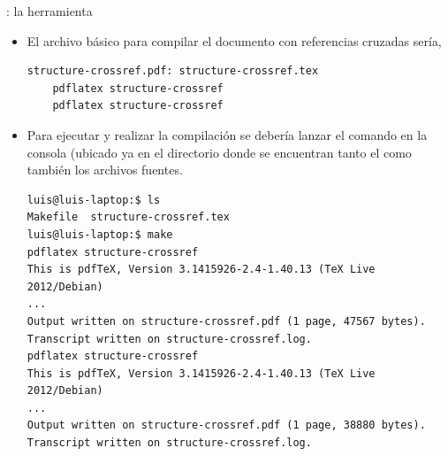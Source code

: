 \documentclass{beamer}
\begin{document}
\begin{frame}[fragile]{\insertsection: la herramienta }
  \begin{itemize}
    \item El archivo  básico para compilar el documento
      con referencias cruzadas sería,
    \begin{center}
      \begin{verbatim}
structure-crossref.pdf: structure-crossref.tex
	pdflatex structure-crossref
	pdflatex structure-crossref
      \end{verbatim}
    \end{center}
  \item Para ejecutar y realizar la compilación se debería lanzar el
    comando  en la consola (ubicado ya en el directorio
    donde se encuentran tanto el  como también los
    archivos fuentes.
    \begin{center}
      \begin{verbatim}
luis@luis-laptop:$ ls
Makefile  structure-crossref.tex
luis@luis-laptop:$ make
pdflatex structure-crossref
This is pdfTeX, Version 3.1415926-2.4-1.40.13 (TeX Live 2012/Debian)
...
Output written on structure-crossref.pdf (1 page, 47567 bytes).
Transcript written on structure-crossref.log.
pdflatex structure-crossref
This is pdfTeX, Version 3.1415926-2.4-1.40.13 (TeX Live 2012/Debian)
...
Output written on structure-crossref.pdf (1 page, 38880 bytes).
Transcript written on structure-crossref.log.
      \end{verbatim}
    \end{center}
  \end{itemize}
\end{frame}
\end{document}
